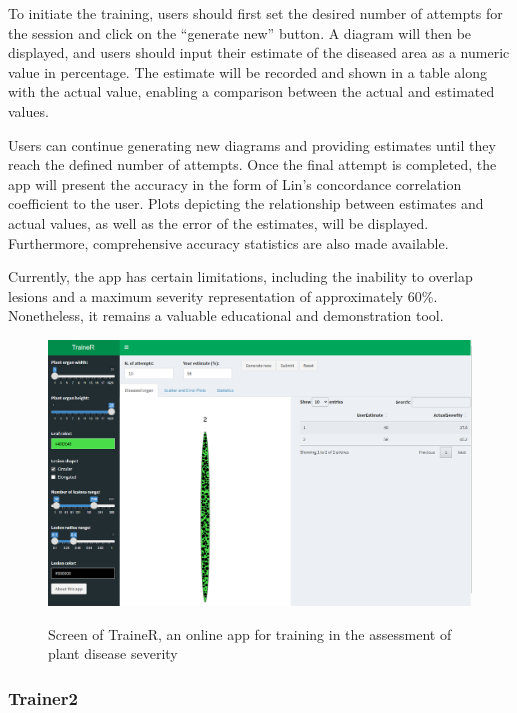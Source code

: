 \documentclass[
  letterpaper,
  DIV=11,
  numbers=noendperiod]{scrreprt}
\begin{document}
To initiate the training, users should first set the desired number of
attempts for the session and click on the ``generate new'' button. A
diagram will then be displayed, and users should input their estimate of
the diseased area as a numeric value in percentage. The estimate will be
recorded and shown in a table along with the actual value, enabling a
comparison between the actual and estimated values.

Users can continue generating new diagrams and providing estimates until
they reach the defined number of attempts. Once the final attempt is
completed, the app will present the accuracy in the form of Lin's
concordance correlation coefficient to the user. Plots depicting the
relationship between estimates and actual values, as well as the error
of the estimates, will be displayed. Furthermore, comprehensive accuracy
statistics are also made available.

Currently, the app has certain limitations, including the inability to
overlap lesions and a maximum severity representation of approximately
60\%. Nonetheless, it remains a valuable educational and demonstration
tool.

\begin{figure}

{\centering 

\href{https://edelponte.shinyapps.io/traineR/}{\includegraphics[width=4.47917in,height=\textheight]{imgs/trainer.png}}

}

\caption{\label{fig-trainer}Screen of TraineR, an online app for
training in the assessment of plant disease severity}

\end{figure}

\hypertarget{trainer2}{%
\subsubsection{Trainer2}\label{trainer2}}
\end{document}

